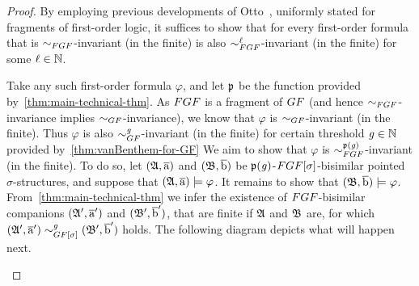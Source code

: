 \begin{proof}
By employing previous developments of Otto~\cite[Obs.~13]{Otto04}, uniformly stated for fragments of first-order logic, it suffices to show that for every first-order formula that is $\bisimto_{\FGF}$-invariant (in the finite) is also $\bisimto_{\FGF}^{\ell}$-invariant (in the finite) for some $\ell \in {\mathbb{N}}$.

Take any such first-order formula $\varphi$, and let $\mathfrak{p}$ be the function provided by~\cref{thm:main-technical-thm}.
As $\FGF$ is a fragment of $\GF$ (and hence $\bisimto_{\FGF}$-invariance implies $\bisimto_{\GF}$-invariance), we know that $\varphi$ is $\bisimto_{\GF}$-invariant (in the finite).
Thus $\varphi$ is also $\bisimto_{\GF}^{\mathit{g}}$-invariant (in the finite) for certain threshold $\mathit{g} \in {\mathbb{N}}$ provided by~\cref{thm:vanBenthem-for-GF}
We aim to show that $\varphi$ is $\bisimto_{\FGF}^{\homop(\mathit{g})}$-invariant (in the finite).
To do so, let $({\mathfrak{A}}, \overline{\mathrm{a}})$ and $({\mathfrak{B}}, \overline{\mathrm{b}})$ be $\mathfrak{p}(\mathit{g})$-$\FGF[\sigma]$-bisimilar pointed $\sigma$-structures, and suppose that $({\mathfrak{A}}, \overline{\mathrm{a}}) \models \varphi$. It remains to show that $({\mathfrak{B}}, \overline{\mathrm{b}}) \models \varphi$.
From~\cref{thm:main-technical-thm} we infer the existence of $\FGF$-bisimilar companions $({\mathfrak{A}}', \overline{\mathrm{a}}')$ and $({\mathfrak{B}}', \overline{\mathrm{b}}')$, that are finite if ${\mathfrak{A}}$ and ${\mathfrak{B}}$ are, for which $(\str{A}', \elemtuplea') \bisimto^{\mathit{g}}_{\GF[\sigma]} (\str{B}', \elemtupleb')$ holds.
The following diagram depicts what will happen next.
\begin{figure}[H]
  \centering
\end{figure}
\end{proof}
